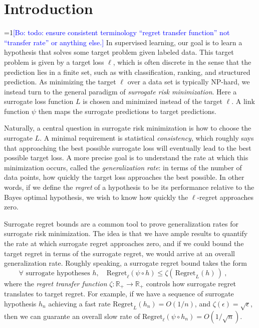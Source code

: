 \documentclass{article}
\theoremstyle{definition}\newtheorem{definition}{Definition}
\theoremstyle{definition}\newtheorem{assumption}{Assumption}
\newcommand{\Comments}{1}
\newcommand{\mynote}[2]{\ifnum\Comments=1\textcolor{#1}{#2}\fi}
\newcommand{\bo}[1]{\mynote{blue}{[Bo: #1]}}
\newcommand{\reals}{\mathbb{R}}
\newcommand{\Reg}{\mathrm{Regret}}
\begin{document}
\section{Introduction}
\bo{todo: ensure consistent terminology ``regret transfer function'' not ``transfer rate'' or anything else.}
In supervised learning, our goal is to learn a hypothesis that solves some target problem given labeled data.
This target problem is given by a target loss $\ell$, which is often discrete in the sense that the prediction lies in a finite set, such as with classification, ranking, and structured prediction.
As minimizing the target $\ell$ over a data set is typically NP-hard, we instead turn to the general paradigm of \emph{surrogate risk minimization}.
Here a surrogate loss function $L$ is chosen and minimized instead of the target $\ell$.
A link function $\psi$ then maps the surrogate predictions to target predictions.

Naturally, a central question in surrogate risk minimization is how to choose the surrogate $L$.
A minimal requirement is statistical \emph{consistency}, which roughly says that approaching the best possible surrogate loss will eventually lead to the best possible target loss.
A more precise goal is to understand the rate at which this minimization occurs, called the \emph{generalization rate}: in terms of the number of data points, how quickly the target loss approaches the best possible.
In other words, if we define the \emph{regret} of a hypothesis to be its performance relative to the Bayes optimal hypothesis, we wish to know how quickly the $\ell$-regret approaches zero.

Surrogate regret bounds are a common tool to prove generalization rates for surrogate risk minimization.
The idea is that we have ample results to quantify the rate at which surrogate regret approaches zero, and if we could bound the target regret in terms of the surrogate regret, we would arrive at an overall generalization rate.
Roughly speaking, a surrogate regret bound takes the form
\begin{equation}
  \label{eq:surrogate-regret-bound-informal}
  \forall \text{ surrogate hypotheses } h, \quad \Reg_\ell(\psi\circ h) \leq \zeta(\, \Reg_L(h) \,)~,\qquad
\end{equation}
where the \emph{regret transfer function} $\zeta : \reals_+ \to \reals_+$ controls how surrogate regret translates to target regret.
For example, if we have a sequence of surrogate hypothesis $h_n$ achieving a fast rate $\Reg_L(h_n) = O(1/n)$, and $\zeta(\epsilon) = \sqrt{\epsilon}$, then we can guarante an overall slow rate of $\Reg_\ell(\psi \circ h_n) = O(1/\sqrt{n})$.
\end{document}
